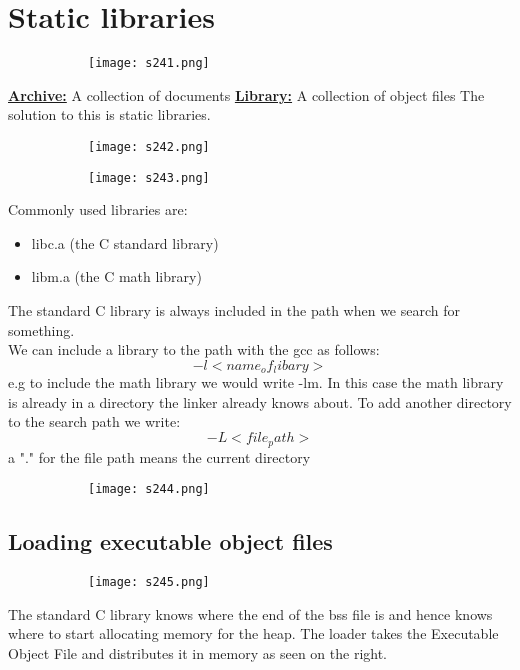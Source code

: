 \documentclass[8pt]{extreport}
\begin{document}
\section{Static libraries}
\begin{figure}[H]
\centering
\begin{subfigure}[b]{0.4\linewidth}
\texttt{[image: s241.png]}
\end{subfigure}
\end{figure}
\underline{\textbf{Archive:}} A collection of documents
\underline{\textbf{Library:}} A  collection of object files
The solution to this is static libraries.
\begin{figure}[H]
\centering
\begin{subfigure}[b]{0.4\linewidth}
\texttt{[image: s242.png]}
\end{subfigure}
\begin{subfigure}[b]{0.4\linewidth}
\texttt{[image: s243.png]}
\end{subfigure}
\end{figure}
Commonly used libraries are:
\begin{itemize}
\item libc.a (the C standard library)
\item libm.a (the C math library)
\end{itemize}
The standard C library is always included in the path when we search for something.\\
We can include a library to the path with the gcc as follows:
$$ -l<name_of_libary>$$
e.g to include the math library we would write -lm. In this case the math library is already in a directory the linker already knows about. To add another directory to the search path we write:
$$-L<file_path>$$
a "." for the file path means the current directory
\begin{figure}[H]
\centering
\begin{subfigure}[b]{0.4\linewidth}
\texttt{[image: s244.png]}
\end{subfigure}
\end{figure}
\subsection{Loading executable object files}
\begin{figure}[H]
\centering
\begin{subfigure}[b]{0.4\linewidth}
\texttt{[image: s245.png]}
\end{subfigure}
\end{figure}
The standard C library knows where the end of the bss file is and hence knows where to start allocating memory for the heap. The loader takes the Executable Object File and distributes it in memory as seen on the right.
\end{document}
